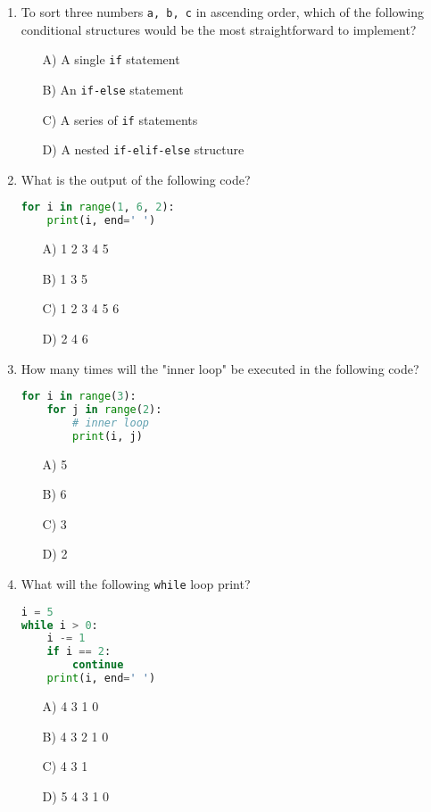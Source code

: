 \documentclass[9pt]{article}
\begin{document}
\begin{multicols}{2}
\begin{enumerate}
\item To sort three numbers \texttt{a, b, c} in ascending order, which of the following conditional structures would be the most straightforward to implement?
\begin{enumerate}
    \item[A)] A single \texttt{if} statement
    \item[B)] An \texttt{if-else} statement
    \item[C)] A series of \texttt{if} statements
    \item[D)] A nested \texttt{if-elif-else} structure
\end{enumerate}

\item What is the output of the following code?
\begin{lstlisting}[language=Python]
for i in range(1, 6, 2):
    print(i, end=' ')
\end{lstlisting}
\begin{enumerate}
\item[A)] 1 2 3 4 5
\item[B)] 1 3 5
\item[C)] 1 2 3 4 5 6
\item[D)] 2 4 6
\end{enumerate}

\item How many times will the "inner loop" be executed in the following code?
\begin{lstlisting}[language=Python]
for i in range(3):
    for j in range(2):
        # inner loop
        print(i, j)
\end{lstlisting}
\begin{enumerate}
\item[A)] 5
\item[B)] 6
\item[C)] 3
\item[D)] 2
\end{enumerate}

\item What will the following \texttt{while} loop print?
\begin{lstlisting}[language=Python]
i = 5
while i > 0:
    i -= 1
    if i == 2:
        continue
    print(i, end=' ')
\end{lstlisting}
\begin{enumerate}
\item[A)] 4 3 1 0
\item[B)] 4 3 2 1 0
\item[C)] 4 3 1
\item[D)] 5 4 3 1 0
\end{enumerate}


\end{enumerate}
\end{multicols}
\end{document}
